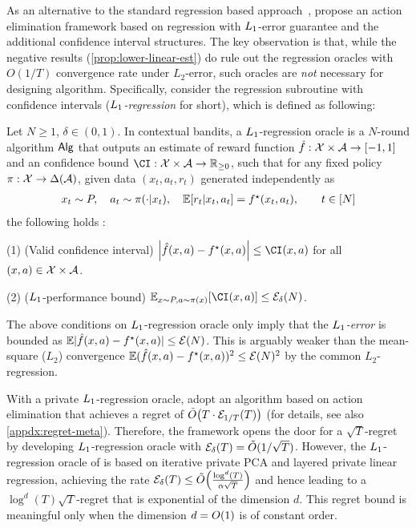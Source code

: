 As an alternative to the standard regression based approach~\citep{foster2018practical,foster2020beyond}, \citet{li2024optimal} propose an action elimination framework based on regression with $L_1$-error guarantee and the additional confidence interval structures. The key observation is that, while the negative results (\cref{prop:lower-linear-est}) do rule out the regression oracles with $O(1/T)$ convergence rate under $L_2$-error, such oracles are \emph{not} necessary for designing algorithm. 
Specifically, \citet{li2024optimal} consider the regression subroutine with confidence intervals (\emph{$L_1$-regression} for short), which is defined as following:


\begin{definition}\label{def:L1-oracle}
Let $N\geq 1$, $\delta\in(0,1)$.
In contextual bandits, a $L_1$-regression oracle is a $N$-round algorithm $\mathsf{Alg}$ that outputs an estimate of reward function $\hat{f}: \mathcal{X}\times \mathcal{A} \to [-1,1]$ and an confidence bound $\CI: \cX\times \cA \to \R_{\geq 0}$, such that for any fixed policy $\pi:\mathcal{X}\to \Delta(\mathcal{A})$, given data $(x_t,a_t,r_t)$ generated independently as
\begin{align*}
\textstyle
    x_t\sim P, \quad
    a_t\sim \pi(\cdot|x_t), \quad
    \mathbb{E}[r_t|x_t,a_t]=f^\star(x_t,a_t), \qquad t\in[N]
\end{align*}
the following holds \whp:

(1) (Valid confidence interval) $\abs{\fhat(x,a)-\fs(x,a)}\leq \CI(x,a)$ for all $(x,a)\in\mathcal{X}\times\mathcal{A}$. 

(2) ($L_1$-performance bound) $\EE_{x\sim P, a\sim \pi(x)} \brac{  \CI(x,a) }\leq \cE_\delta(N)$.
        

\end{definition}

The above conditions on $L_1$-regression oracle only imply that the \emph{$L_1$-error} is bounded as $\mathbb{E}|\hat{f}(x,a)-f^\star(x,a)|\leq \mathcal{E}(N)$. This is arguably weaker than the mean-square ($L_2$) convergence $\mathbb{E}(\hat{f}(x,a)-f^\star(x,a))^2\leq \mathcal{E}(N)^2$ by the common $L_2$-regression. 

With a private $L_1$-regression oracle, \citet{li2024optimal} adopt an algorithm based on action elimination that achieves a regret of $\tilde{O}{\left(  T \cdot \mathcal{E}_{1/T}(T)  \right)}$ (for details, see also \cref{appdx:regret-meta}). Therefore, the framework opens the door for a $\sqrt{T}$-regret by developing $L_1$-regression oracle with $\mathcal{E}_\delta(T)=\tilde{O}(1/\sqrt{T})$. 
However, the $L_1$-regression oracle of \citet{li2024optimal} is based on iterative private PCA and layered private linear regression, achieving the rate $\mathcal{E}_{\delta}(T) \leq \tilde{O}{\left( 
\frac{\log^d(T)}{\alpha\sqrt{T}} \right)}$ and hence leading to a $\log^d(T)\sqrt{T}$-regret that is exponential of the dimension $d$. This regret bound is meaningful only when the dimension $d=O{\left( 1 \right)}$ is of constant order. 

